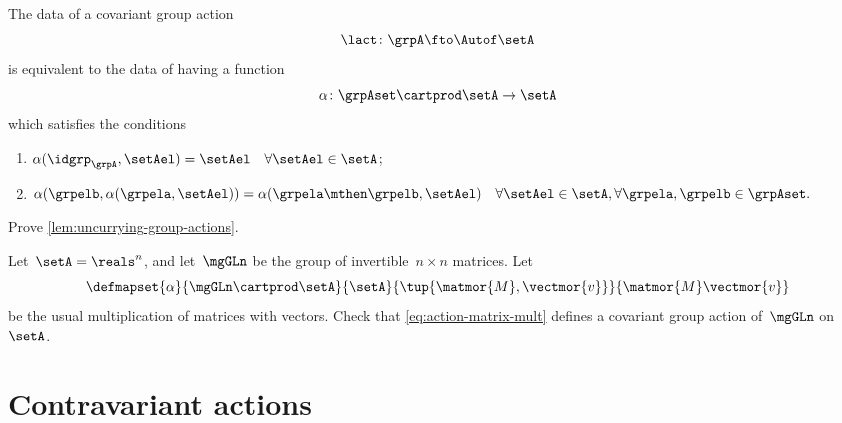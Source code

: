 \begin{lemma}\label{lem:uncurrying-group-actions}
The data of a covariant group action 
\begin{equation}
        \lact \colon \grpA \fto \Autof\setA
    \end{equation}
is equivalent to the data of having a function
\begin{equation}
\alpha \colon \grpAset \cartprod \setA \to \setA
\end{equation}
which satisfies the conditions 
\begin{enumerate}
\item $ \alpha (\idgrp_\grpA, \setAel) = \setAel \quad \forall \setAel \in \setA$;
\item $ \alpha (\grpelb, \alpha(\grpela, \setAel)) = \alpha (\grpela \mthen \grpelb, \setAel) \quad \forall \setAel \in \setA, \forall \grpela, \grpelb \in \grpAset.$
\end{enumerate}
\end{lemma}

\vfill%


\begin{gradedexercise}
    \label{ex:UncurryingGroupActions}
    Prove \cref{lem:uncurrying-group-actions}.
\end{gradedexercise}

\begin{gradedexercise}
    \label{ex:MatrixMultAction}
    Let~$\setA = \reals^n$, and let~$\mgGLn$ be the group of invertible~$n \times n$ matrices.
    Let
    \begin{equation}
        \label{eq:action-matrix-mult}
        \defmapset{
            \alpha
        }{
            \mgGLn \cartprod \setA
        }{
            \setA
        }{
            \tup{\matmor{M}, \vectmor{v}}
        }{
            \matmor{M}\vectmor{v}
        }
    \end{equation}
    be the usual multiplication of matrices with vectors.
    Check that \cref{eq:action-matrix-mult} defines a covariant group action of~$\mgGLn$ on~$\setA$.
\end{gradedexercise}


\section{Contravariant actions}

